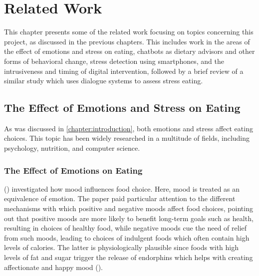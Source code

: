 
\chapter{Related Work}\label{chapter:related_work}
This chapter presents some of the related work focusing on topics concerning this project, as discussed in the previous chapters. This includes work in the areas of the effect of emotions and stress on eating, chatbots as dietary advisors and other forms of behavioral change, stress detection using smartphones, and the intrusiveness and timing of digital intervention, followed by a brief review of a similar study which uses dialogue systems to assess stress eating.

\section{The Effect of Emotions and Stress on Eating}
As was discussed in \autoref{chapter:introduction}, both emotions and stress affect eating choices. This topic has been widely researched in a multitude of fields, including psychology, nutrition, and computer science.

\subsection{The Effect of Emotions on Eating}
\citeauthor{4_mood_eat} (\citeyear{4_mood_eat}) investigated how mood influences food choice. Here, mood is treated as an equivalence of emotion. The paper paid particular attention to the different mechanisms with which positive and negative moods affect food choices, pointing out that positive moods are more likely to benefit long-term goals such as health, resulting in choices of healthy food, while negative moods cue the need of relief from such moods, leading to choices of indulgent foods which often contain high levels of calories. The latter is physiologically plausible since foods with high levels of fat and sugar trigger the release of endorphins which helps with creating affectionate and happy mood (\cite{32_endorphins}).\bigskip

